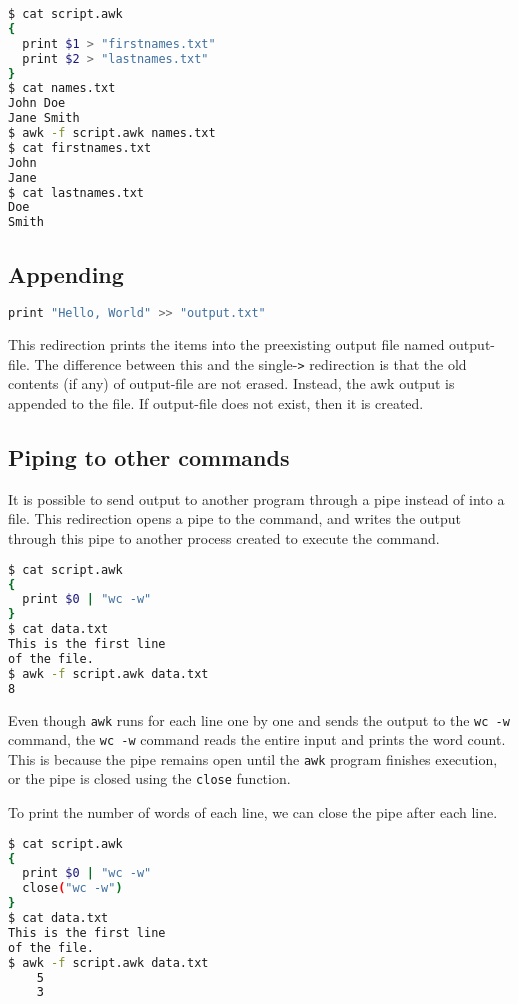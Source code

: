 \begin{lstlisting}[language=bash]
$ cat script.awk
{
  print $1 > "firstnames.txt"
  print $2 > "lastnames.txt"
}
$ cat names.txt
John Doe
Jane Smith
$ awk -f script.awk names.txt
$ cat firstnames.txt
John
Jane
$ cat lastnames.txt
Doe
Smith
\end{lstlisting}

\subsection{Appending}

\begin{lstlisting}[language=bash]
print "Hello, World" >> "output.txt"
\end{lstlisting}

This redirection prints the items into the preexisting output file named output-file.
The difference between this and the single-\lstinline|>| redirection is that the old contents (if any) of output-file are not erased.
Instead, the awk output is appended to the file.
If output-file does not exist, then it is created.

\subsection{Piping to other commands}

It is possible to send output to another program through a pipe instead of into a file.
This redirection opens a pipe to the command, and writes the output through this pipe to another process created to execute the command.

\begin{lstlisting}[language=bash]
$ cat script.awk
{
  print $0 | "wc -w"
}
$ cat data.txt
This is the first line
of the file.
$ awk -f script.awk data.txt
8
\end{lstlisting}

Even though \lstinline|awk| runs for each line one by one and sends the output to the \lstinline|wc -w| command,
the \lstinline|wc -w| command reads the entire input and prints the word count.
This is because the pipe remains open until the \lstinline|awk| program finishes execution,
or the pipe is closed using the \lstinline|close| function.

To print the number of words of each line, we can close the pipe after each line.

\begin{lstlisting}[language=bash]
$ cat script.awk
{
  print $0 | "wc -w"
  close("wc -w")
}
$ cat data.txt
This is the first line
of the file.
$ awk -f script.awk data.txt
    5
    3
\end{lstlisting}

